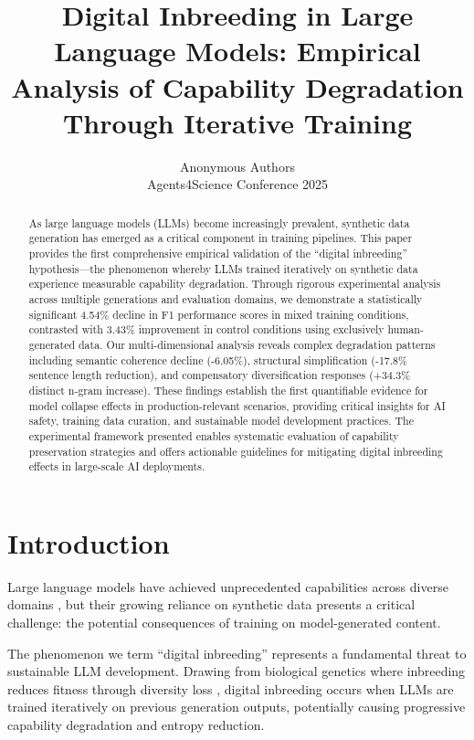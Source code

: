 \documentclass{article}
\title{Digital Inbreeding in Large Language Models: Empirical Analysis of Capability Degradation Through Iterative Training}
\author{%
  Anonymous Authors\\
  Agents4Science Conference 2025\\
}
\begin{document}
\maketitle

\begin{abstract}
As large language models (LLMs) become increasingly prevalent, synthetic data generation has emerged as a critical component in training pipelines. This paper provides the first comprehensive empirical validation of the ``digital inbreeding'' hypothesis—the phenomenon whereby LLMs trained iteratively on synthetic data experience measurable capability degradation. Through rigorous experimental analysis across multiple generations and evaluation domains, we demonstrate a statistically significant 4.54\% decline in F1 performance scores in mixed training conditions, contrasted with 3.43\% improvement in control conditions using exclusively human-generated data. Our multi-dimensional analysis reveals complex degradation patterns including semantic coherence decline (-6.05\%), structural simplification (-17.8\% sentence length reduction), and compensatory diversification responses (+34.3\% distinct n-gram increase). These findings establish the first quantifiable evidence for model collapse effects in production-relevant scenarios, providing critical insights for AI safety, training data curation, and sustainable model development practices. The experimental framework presented enables systematic evaluation of capability preservation strategies and offers actionable guidelines for mitigating digital inbreeding effects in large-scale AI deployments.
\end{abstract}

\section{Introduction}

Large language models have achieved unprecedented capabilities across diverse domains \citep{brown2020language, chowdhery2022palm, touvron2023llama}, but their growing reliance on synthetic data presents a critical challenge: the potential consequences of training on model-generated content.

The phenomenon we term ``digital inbreeding'' represents a fundamental threat to sustainable LLM development. Drawing from biological genetics where inbreeding reduces fitness through diversity loss \citep{charlesworth2009fundamental}, digital inbreeding occurs when LLMs are trained iteratively on previous generation outputs, potentially causing progressive capability degradation and entropy reduction.
\end{document}
